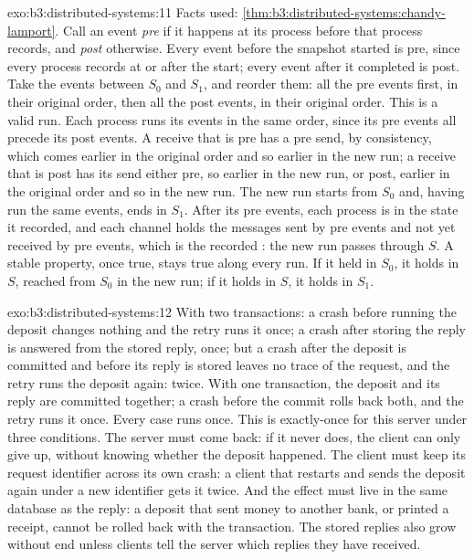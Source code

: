 \begin{solution}{exo:b3:distributed-systems:11}
Facts used: \cref{thm:b3:distributed-systems:chandy-lamport}. Call an event \emph{pre} if it happens at its process before that process records, and \emph{post} otherwise. Every event before the snapshot started is pre, since every process records at or after the start; every event after it completed is post. Take the events between $S_0$ and $S_1$, and reorder them: all the pre events first, in their original order, then all the post events, in their original order. This is a valid run. Each process runs its events in the same order, since its pre events all precede its post events. A receive that is pre has a pre send, by consistency, which comes earlier in the original order and so earlier in the new run; a receive that is post has its send either pre, so earlier in the new run, or post, earlier in the original order and so in the new run. The new run starts from $S_0$ and, having run the same events, ends in $S_1$. After its pre events, each process is in the state it recorded, and each channel holds the messages sent by pre events and not yet received by pre events, which is the recorded : the new run passes through $S$. A stable property, once true, stays true along every run. If it held in $S_0$, it holds in $S$, reached from $S_0$ in the new run; if it holds in $S$, it holds in $S_1$.
\end{solution}

\begin{solution}{exo:b3:distributed-systems:12}
With two transactions: a crash before running the deposit changes nothing and the retry runs it once; a crash after storing the reply is answered from the stored reply, once; but a crash after the deposit is committed and before its reply is stored leaves no trace of the request, and the retry runs the deposit again: twice. With one transaction, the deposit and its reply are committed together; a crash before the commit rolls back both, and the retry runs it once. Every case runs once. This is exactly-once for this server under three conditions. The server must come back: if it never does, the client can only give up, without knowing whether the deposit happened. The client must keep its request identifier across its own crash: a client that restarts and sends the deposit again under a new identifier gets it twice. And the effect must live in the same database as the reply: a deposit that sent money to another bank, or printed a receipt, cannot be rolled back with the transaction. The stored replies also grow without end unless clients tell the server which replies they have received.
\end{solution}

